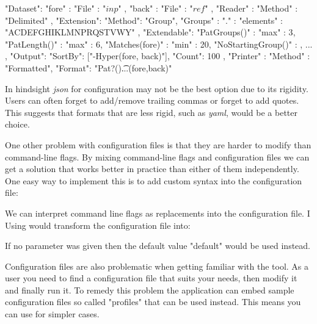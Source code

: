 \begin{file}
{
    "Dataset": {
        "fore" : { "File" : "$inp$" },
        "back" : { "File" : "$ref$" }
    },
    "Reader" : {
        "Method" : "Delimited"
    },
    "Extension": {
        "Method": "Group",
        "Groups" : {
            "." : { "elements" : "ACDEFGHIKLMNPRQSTVWY"}
        },
        "Extendable": {
            "PatGroups()" : {"max" : 3},
            "PatLength()" : {"max" : 6},
            "Matches(fore)" : {"min" : 20},
            "NoStartingGroup()" : {}
        },
        ...
    },
    "Output": {
        "SortBy": ["-Hyper(fore, back)"],
        "Count": 100
    },
    "Printer" : {
        "Method" : "Formatted",
        "Format": "Pat?()\t...\tHyper(fore,back)\n"
    }
}
\end{file}

In hindsight \emph{json} for configuration may not be the best option due to its rigidity. Users can often forget to add/remove trailing commas or forget to add quotes. This suggests that formats that are less rigid, such as \emph{yaml}\cite{yaml}, would be a better choice.

One other problem with configuration files is that they are harder to modify than command-line flags. By mixing command-line flags and configuration files we can get a solution that works better in practice than either of them independently. One easy way to implement this is to add custom syntax into the configuration file:

\begin{file}
"Datasets" : {
    "fore" : { "File" : "$argument:default$"
    ...
\end{file}

We can interpret command line flags as replacements into the configuration file. I Using  would transform the configuration file into:

\begin{file}
"Datasets" : {
    "fore" : { "File" : "other"
    ...
\end{file}

If no parameter was given then the default value "default" would be used instead.

Configuration files are also problematic when getting familiar with the tool. As a user you need to find a configuration file that suits your needs, then modify it and finally run it. To remedy this problem the application can embed sample configuration files so called "profiles" that can be used instead. This means you can use  for simpler cases.

